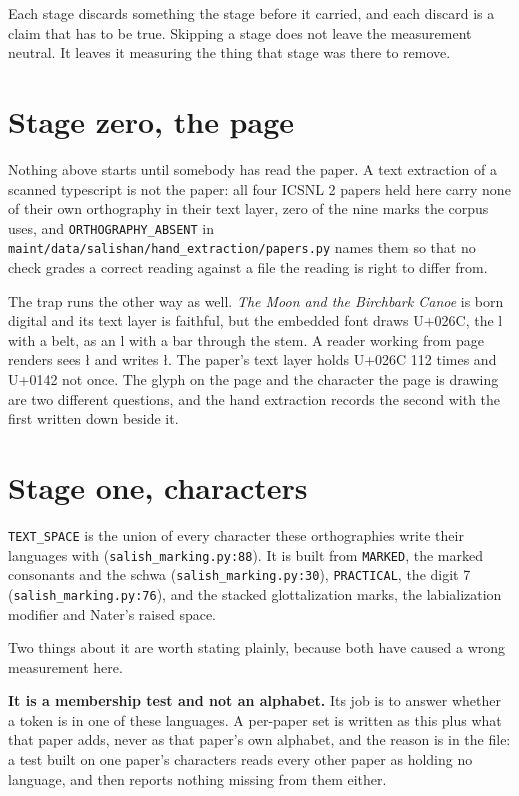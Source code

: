 Each stage discards something the stage before it carried, and each discard is a claim that has to
be true. Skipping a stage does not leave the measurement neutral. It leaves it measuring the thing
that stage was there to remove.

\section{Stage zero, the page}

Nothing above starts until somebody has read the paper. A text extraction of a scanned typescript is
not the paper: all four ICSNL 2 papers held here carry none of their own orthography in their text
layer, zero of the nine marks the corpus uses, and
\texttt{ORTHOGRAPHY\_\allowbreak{}ABSENT} in
\texttt{maint/\allowbreak{}data/\allowbreak{}salishan/\allowbreak{}hand\_\allowbreak{}extraction/\allowbreak{}papers.\allowbreak{}py}
names them so that no check grades a correct reading against a file the reading is right to differ
from.

The trap runs the other way as well. \emph{The Moon and the Birchbark Canoe} is born digital and its
text layer is faithful, but the embedded font draws U+026C, the l with a belt, as an l with a bar
through the stem. A reader working from page renders sees ł and writes ł. The paper's text layer
holds U+026C 112 times and U+0142 not once. The glyph on the page and the character the page is
drawing are two different questions, and the hand extraction records the second with the first
written down beside it.

\section{Stage one, characters}

\texttt{TEXT\_\allowbreak{}SPACE} is the union of every character these orthographies write their
languages with
(\texttt{salish\_\allowbreak{}marking.\allowbreak{}py:88}). It is built from
\texttt{MARKED}, the marked consonants and the schwa
(\texttt{salish\_\allowbreak{}marking.\allowbreak{}py:30}), \texttt{PRACTICAL}, the digit 7
(\texttt{salish\_\allowbreak{}marking.\allowbreak{}py:76}), and the stacked glottalization marks,
the labialization modifier and Nater's raised space.

Two things about it are worth stating plainly, because both have caused a wrong measurement here.

\textbf{It is a membership test and not an alphabet.} Its job is to answer whether a token is in one
of these languages. A per-paper set is written as this plus what that paper adds, never as that
paper's own alphabet, and the reason is in the file: a test built on one paper's characters reads
every other paper as holding no language, and then reports nothing missing from them either.


